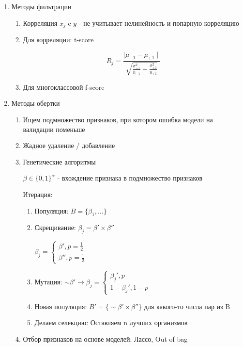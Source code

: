 \documentclass[a4paper, 12pt]{article}
\begin{document}
\begin{enumerate}
    \item Методы фильтрации
    \begin{enumerate}
        \item Корреляция $x_j$ c $y$ - 
        не учитывает нелинейность и попарную корреляцию
        \item Для корреляции: t-score
        
        \[R_j = \frac{\mid\mu_{-1} - \mu_{+1}\mid}
        {\sqrt{\frac{\sigma_{-1}^2}{n_{-1}} +
        \frac{\sigma_{+1}^2}{n_{+1}}}}\]

        \item Для многоклассовой f-score
    \end{enumerate}
    \item Методы обертки
    \begin{enumerate}
        \item Ищем подмножество признаков, при
        котором ошибка модели на валидации поменьше
        \item Жадное удаление / добавление
        \item Генетические алгоритмы
        
        $\beta \in \{0, 1\}^{\alpha}$ - вхождение признака в подмножество
        признаков

        Итерация:

        \begin{enumerate}
            \item Популяция: $B = \{\beta_1, \ldots\}$
            \item Скрещивание: $\beta_j = \beta' \times \beta''$
            
            $\beta_j =
            \begin{cases}
                \beta', p = \frac{1}{2} \\
                \beta'', p = \frac{1}{2}
            \end{cases}$

            \item Мутация: $\sim \beta' \rightarrow \beta_j =
            \begin{cases}
                \beta_j', p \\
                1 - \beta_j', 1 - p
            \end{cases}$ 

            \item Новая популяция: $B' = \{\sim \beta' 
            \times \beta''\}$ для какого-то числа пар из B

            \item Делаем селекцию: Оставляем n лучших организмов
        \end{enumerate}
        \item Отбор признаков на основе моделей: Лассо, Out of bag
    \end{enumerate}
\end{enumerate}
\end{document}
